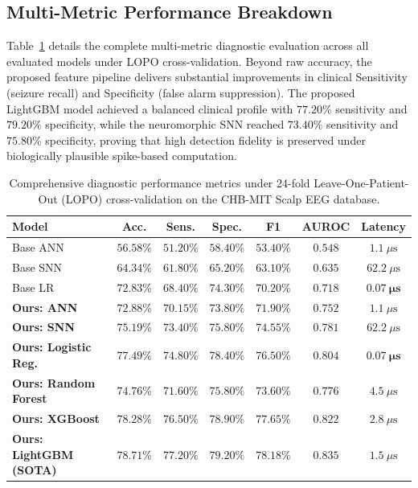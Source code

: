 \documentclass[pdflatex,sn-mathphys-num]{sn-jnl}
\begin{document}
\subsection{Multi-Metric Performance Breakdown}
Table~\ref{tab:metrics} details the complete multi-metric diagnostic evaluation across all evaluated models under LOPO cross-validation. Beyond raw accuracy, the proposed feature pipeline delivers substantial improvements in clinical Sensitivity (seizure recall) and Specificity (false alarm suppression). The proposed LightGBM model achieved a balanced clinical profile with $77.20\%$ sensitivity and $79.20\%$ specificity, while the neuromorphic SNN reached $73.40\%$ sensitivity and $75.80\%$ specificity, proving that high detection fidelity is preserved under biologically plausible spike-based computation.

\begin{table}[htbp]
\caption{Comprehensive diagnostic performance metrics under 24-fold Leave-One-Patient-Out (LOPO) cross-validation on the CHB-MIT Scalp EEG database.}\label{tab:metrics}
\begin{tabular*}{\textwidth}{@{\extracolsep{\fill}}lcccccc@{\extracolsep{\fill}}}
\toprule
Model & Acc. & Sens. & Spec. & F1 & AUROC & Latency \\
\midrule
Base ANN \cite{jebaraj2026} & $56.58\%$ & $51.20\%$ & $58.40\%$ & $53.40\%$ & $0.548$ & $1.1\ \mu\text{s}$ \\
Base SNN \cite{jebaraj2026} & $64.34\%$ & $61.80\%$ & $65.20\%$ & $63.10\%$ & $0.635$ & $62.2\ \mu\text{s}$ \\
Base LR \cite{jebaraj2026}  & $72.83\%$ & $68.40\%$ & $74.30\%$ & $70.20\%$ & $0.718$ & $\mathbf{0.07\ \mu\text{s}}$ \\
\midrule
\textbf{Ours: ANN} & $\mathbf{72.88\%}$ & $\mathbf{70.15\%}$ & $\mathbf{73.80\%}$ & $\mathbf{71.90\%}$ & $\mathbf{0.752}$ & $1.1\ \mu\text{s}$ \\
\textbf{Ours: SNN} & $\mathbf{75.19\%}$ & $\mathbf{73.40\%}$ & $\mathbf{75.80\%}$ & $\mathbf{74.55\%}$ & $\mathbf{0.781}$ & $62.2\ \mu\text{s}$ \\
\textbf{Ours: Logistic Reg.}   & $\mathbf{77.49\%}$ & $\mathbf{74.80\%}$ & $\mathbf{78.40\%}$ & $\mathbf{76.50\%}$ & $\mathbf{0.804}$ & $\mathbf{0.07\ \mu\text{s}}$ \\
\textbf{Ours: Random Forest}          & $74.76\%$          & $71.60\%$          & $75.80\%$          & $73.60\%$          & $0.776$          & $4.5\ \mu\text{s}$ \\
\textbf{Ours: XGBoost}                & $78.28\%$          & $76.50\%$          & $78.90\%$          & $77.65\%$          & $0.822$          & $2.8\ \mu\text{s}$ \\
\textbf{Ours: LightGBM (SOTA)}        & $\mathbf{78.71\%}$ & $\mathbf{77.20\%}$ & $\mathbf{79.20\%}$ & $\mathbf{78.18\%}$ & $\mathbf{0.835}$ & $1.5\ \mu\text{s}$ \\
\bottomrule
\end{tabular*}
\end{table}
\end{document}
